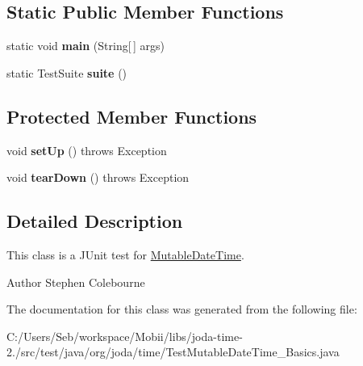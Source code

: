 \subsection*{Static Public Member Functions}
\begin{DoxyCompactItemize}
\item 
\hypertarget{classorg_1_1joda_1_1time_1_1_test_mutable_date_time___basics_a320841b5f5106ad448b9c324487ac741}{static void {\bfseries main} (String\mbox{[}$\,$\mbox{]} args)}\label{classorg_1_1joda_1_1time_1_1_test_mutable_date_time___basics_a320841b5f5106ad448b9c324487ac741}

\item 
\hypertarget{classorg_1_1joda_1_1time_1_1_test_mutable_date_time___basics_a35a35ba09a1c19482521cd2c7bf96c6d}{static Test\-Suite {\bfseries suite} ()}\label{classorg_1_1joda_1_1time_1_1_test_mutable_date_time___basics_a35a35ba09a1c19482521cd2c7bf96c6d}

\end{DoxyCompactItemize}
\subsection*{Protected Member Functions}
\begin{DoxyCompactItemize}
\item 
\hypertarget{classorg_1_1joda_1_1time_1_1_test_mutable_date_time___basics_aa650d3bbd2238141d4eafab9646cfa5c}{void {\bfseries set\-Up} ()  throws Exception }\label{classorg_1_1joda_1_1time_1_1_test_mutable_date_time___basics_aa650d3bbd2238141d4eafab9646cfa5c}

\item 
\hypertarget{classorg_1_1joda_1_1time_1_1_test_mutable_date_time___basics_a304e6e5fc3eab0cabef72729c98bb0f2}{void {\bfseries tear\-Down} ()  throws Exception }\label{classorg_1_1joda_1_1time_1_1_test_mutable_date_time___basics_a304e6e5fc3eab0cabef72729c98bb0f2}

\end{DoxyCompactItemize}


\subsection{Detailed Description}
This class is a J\-Unit test for \hyperlink{classorg_1_1joda_1_1time_1_1_mutable_date_time}{Mutable\-Date\-Time}.

\begin{DoxyAuthor}{Author}
Stephen Colebourne 
\end{DoxyAuthor}


The documentation for this class was generated from the following file\-:\begin{DoxyCompactItemize}
\item 
C\-:/\-Users/\-Seb/workspace/\-Mobii/libs/joda-\/time-\/2./src/test/java/org/joda/time/Test\-Mutable\-Date\-Time\-\_\-\-Basics.\-java\end{DoxyCompactItemize}
